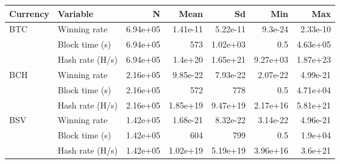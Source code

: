 
\begin{tabular}[t]{llrrrrr}
\toprule
Currency & Variable & N & Mean & Sd & Min & Max\\
\midrule
BTC & Winning rate & 6.94e+05 & 1.41e-11 & 5.22e-11 & 9.3e-24 & 2.33e-10\\
 & Block time (s) & 6.94e+05 & 573 & 1.02e+03 & 0.5 & 4.63e+05\\
 & Hash rate (H/s) & 6.94e+05 & 1.4e+20 & 1.65e+21 & 9.27e+03 & 1.87e+23\\
BCH & Winning rate & 2.16e+05 & 9.85e-22 & 7.93e-22 & 2.07e-22 & 4.99e-21\\
 & Block time (s) & 2.16e+05 & 572 & 778 & 0.5 & 4.71e+04\\
 & Hash rate (H/s) & 2.16e+05 & 1.85e+19 & 9.47e+19 & 2.17e+16 & 5.81e+21\\
BSV & Winning rate & 1.42e+05 & 1.68e-21 & 8.32e-22 & 3.14e-22 & 4.96e-21\\
 & Block time (s) & 1.42e+05 & 604 & 799 & 0.5 & 1.9e+04\\
 & Hash rate (H/s) & 1.42e+05 & 1.02e+19 & 5.19e+19 & 3.96e+16 & 3.6e+21\\
\bottomrule
\end{tabular}
